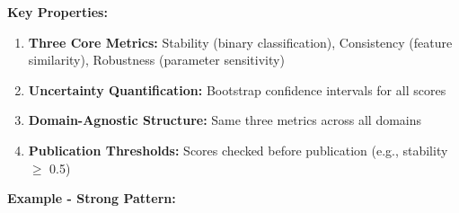 \documentclass[
]{article}
\providecommand{\tightlist}{%
  \setlength{\itemsep}{0pt}\setlength{\parskip}{0pt}}
\begin{document}
\textbf{Key Properties:}

\begin{enumerate}
\def\labelenumi{\arabic{enumi}.}
\tightlist
\item
  \textbf{Three Core Metrics:} Stability (binary classification),
  Consistency (feature similarity), Robustness (parameter sensitivity)
\item
  \textbf{Uncertainty Quantification:} Bootstrap confidence intervals
  for all scores
\item
  \textbf{Domain-Agnostic Structure:} Same three metrics across all
  domains
\item
  \textbf{Publication Thresholds:} Scores checked before publication
  (e.g., stability $\geq$ 0.5)
\end{enumerate}

\textbf{Example - Strong Pattern:}
\end{document}
